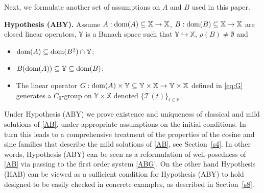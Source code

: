 \documentclass[11pt]{amsart}
\numberwithin{equation}{section}
\newcommand{\RR}{{\mathbb R}}
\theoremstyle{remark}
\theoremstyle{definition}
\newcommand\cT{{\mathcal T}}
\newcommand\bX{{\mathbb X}}
\newcommand\bY{{\mathbb Y}}
\newcommand{\dom}{\text{\rm{dom}}}
\begin{document}
Next, we formulate another set of assumptions on $A$ and $B$ used in this paper.

\noindent\textbf{Hypothesis (ABY).} Assume $A : \dom(A) \subseteq\bX \to\bX$, $B : \dom(B) \subseteq\bX \to\bX$ are closed linear operators, $\bY$ is a Banach space such that $\bY \hookrightarrow \bX$, $\rho(B)\ne\emptyset$ and
\begin{itemize}
	\item[(ABY1)] $\dom(A) \subseteq \dom(B^2) \cap\bY$;
	\item[(ABY2)] $B(\dom(A)) \subseteq\bY \subseteq \dom(B)$;
	\item[(ABY3)] The linear operator $G:\dom(A)\times\bY\subseteq\bY\times\bX\to\bY\times\bX$ defined in \eqref{eq:G} generates a $C_0$-group on $\bY\times\bX$ denoted $\{\cT(t)\}_{t\in\RR}$.
\end{itemize}
Under Hypothesis (ABY) we prove existence and uniqueness of classical and mild solutions of \eqref{AB}, under appropriate assumptions on the initial conditions. In turn this leads to a comprehensive treatment of the properties of the cosine and sine families that describe the mild solutions of \eqref{AB}, see Section~\ref{s4}. In other words, Hypothesis (ABY) can be seen as a reformulation of well-posedness of \eqref{AB} via passing to the first order system \eqref{ABG}. On the other hand Hypothesis (HAB) can be viewed as a sufficient condition for Hypothesis (ABY) to hold designed to be easily checked in concrete examples, as described in Section~\ref{s8}.
\end{document}
